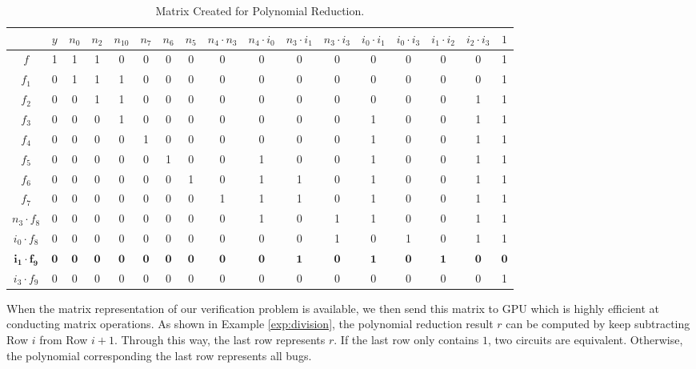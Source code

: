 \begin{Example}
	\begin{table} 
	\begin{center}
	\caption{Matrix Created for Polynomial Reduction.} 
	\label{tab:redres}
	\begin{tabular}{|c||c|c|c|c|c|c|c|c|c|c|c|c|c|c|c|c|} \hline 
				&$y$ 	&$n_0$ &$n_2$	&$n_{10}$	 &$n_7$	&$n_6$  &$n_5$   &$n_4\cdot n_3$  &$n_4\cdot i_0$ 	&$n_3\cdot i_1$	&$n_3\cdot i_3$	&$i_0\cdot i_1$		&$i_0\cdot i_3$ 	&$i_1\cdot i_2$	 &$i_2\cdot i_3$   &$1$ \\
		\hline
		$f$   		&1	&1	&1	&0		&0	&0	&0	&0	&0	&0	&0	&0	&0	&0	&0	&1 \\
		\hline
		$f_1$ 		&0	&1	&1	&1		&0	&0	&0	&0	&0	&0	&0	&0	&0	&0	&0	&1 \\
		\hline
		$f_2$ 		&0	&0	&1	&1		&0	&0	&0	&0	&0	&0	&0	&0	&0	&0	&1	&1 \\
		\hline
		$f_3$		&0	&0	&0	&1		&0	&0	&0	&0	&0	&0	&0	&1	&0	&0	&1	&1 \\
		\hline
		$f_4$		&0	&0	&0	&0		&1	&0	&0	&0	&0	&0	&0	&1	&0	&0	&1	&1\\
		\hline{}
		$f_5$		&0	&0	&0	&0		&0	&1	&0	&0	&1	&0	&0	&1	&0	&0	&1	&1\\
		\hline{}
		$f_6$		&0	&0	&0	&0		&0	&0	&1	&0	&1	&1	&0	&1	&0	&0	&1	&1\\
		\hline{}
		$f_7$		&0	&0	&0	&0		&0	&0	&0	&1	&1	&1	&0	&1	&0	&0	&1	&1\\
	\hline{}
$n_3\cdot f_{8}$	&0	&0	&0	&0		&0	&0	&0	&0	&1	&0	&1	&1	&0	&0	&1	&1\\
	\hline{}
$i_0\cdot f_{8}$ 	&0	&0	&0	&0		&0	&0	&0	&0	&0	&0	&1	&0	&1	&0	&1	&1\\
	\hline
$\mathbf{i_1 \cdot f_{9}}$	&$\mathbf{0}$	&$\mathbf{0}$	&$\mathbf{0}$	&$\mathbf{0}$	&$\mathbf{0}$	&$\mathbf{0}$	&$\mathbf{0}$	
&$\mathbf{0}$	&$\mathbf{0}$	&$\mathbf{1}$	&$\mathbf{0}$	&$\mathbf{1}$	&$\mathbf{0}$	&$\mathbf{1}$	&$\mathbf{0}$	&$\mathbf{0}$\\
	\hline
$i_3 \cdot f_{9}$	&0	&0	&0	&0		&0	&0	&0	&0	&0	&0	&0	&0	&0	&0	&0	&1\\
	\hline
	\end{tabular}
	\end{center}
	\end{table} 
\end{Example}

When the matrix representation of our verification problem is available, we then send this matrix to GPU 
which is highly efficient at conducting matrix operations.
As shown in Example \ref{exp:division}, the polynomial reduction result $r$ can be computed by keep subtracting 
Row $i$ from Row $i+1$. Through this way, the last row represents $r$. If the last row only contains $1$,
two circuits are equivalent. Otherwise, the polynomial corresponding the last row represents all bugs.


